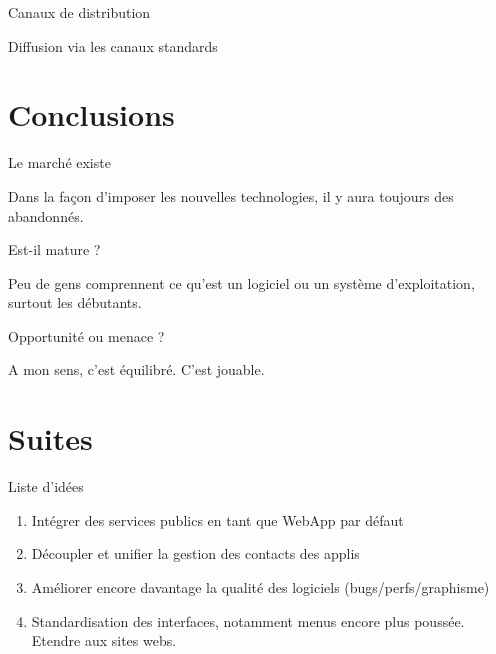 \documentclass[xcolor=svgnames]{beamer}
\begin{document}
    \begin{frame}{Canaux de distribution}
    
        Diffusion via les canaux standards
        
    \end{frame}
    


\section{Conclusions}

    \begin{frame}{Le marché existe}
    
        Dans la façon d’imposer les nouvelles technologies, il y aura toujours des abandonnés.
        
    \end{frame}
    
    \begin{frame}{Est-il mature ?}
    
        Peu de gens comprennent ce qu’est un logiciel ou un système d’exploitation, surtout les débutants.
        
    \end{frame}
    
    \begin{frame}{Opportunité ou menace ?}
        
        A mon sens, c’est équilibré. \pause C’est jouable.
        
    \end{frame}
    
    
\section{Suites}

    \begin{frame}{Liste d’idées}
    
        \begin{enumerate}
            \item Intégrer des services publics en tant que WebApp par défaut
            \item Découpler et unifier la gestion des contacts des applis
            \item Améliorer encore davantage la qualité des logiciels (bugs/perfs/graphisme)
            \item Standardisation des interfaces, notamment menus encore plus poussée. Etendre aux sites webs.
            
        \end{enumerate}
        
    \end{frame}

    \begin{frame}{Participer à cette présentation}
    
        Sur GitHub : \url{
        
        En direct : j’attends vos remarques :)
        
    \end{frame}

    
    
\end{document}
